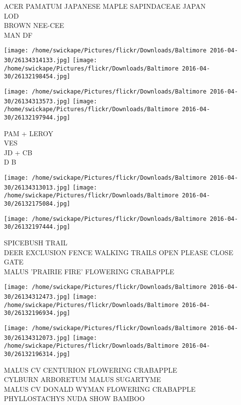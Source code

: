 \documentclass[10pt,letterpaper]{article}
\begin{document}
ACER PAMATUM JAPANESE MAPLE SAPINDACEAE JAPAN\\
LOD\\
BROWN NEE{-}CEE\\
MAN DF\\
\pagebreak

\texttt{[image: /home/swickape/Pictures/flickr/Downloads/Baltimore 2016-04-30/26134314133.jpg]}
\texttt{[image: /home/swickape/Pictures/flickr/Downloads/Baltimore 2016-04-30/26132198454.jpg]}

\texttt{[image: /home/swickape/Pictures/flickr/Downloads/Baltimore 2016-04-30/26134313573.jpg]}
\texttt{[image: /home/swickape/Pictures/flickr/Downloads/Baltimore 2016-04-30/26132197944.jpg]}

PAM + LEROY\\
VES\\
JD + CB\\
D B\\
\pagebreak

\texttt{[image: /home/swickape/Pictures/flickr/Downloads/Baltimore 2016-04-30/26134313013.jpg]}
\texttt{[image: /home/swickape/Pictures/flickr/Downloads/Baltimore 2016-04-30/26132175084.jpg]}

\vspace{0.25in}
\texttt{[image: /home/swickape/Pictures/flickr/Downloads/Baltimore 2016-04-30/26132197444.jpg]}

SPICEBUSH TRAIL\\
DEER EXCLUSION FENCE WALKING TRAILS OPEN PLEASE CLOSE GATE\\
MALUS 'PRAIRIE FIRE' FLOWERING CRABAPPLE\\
\pagebreak

\texttt{[image: /home/swickape/Pictures/flickr/Downloads/Baltimore 2016-04-30/26134312473.jpg]}
\texttt{[image: /home/swickape/Pictures/flickr/Downloads/Baltimore 2016-04-30/26132196934.jpg]}

\texttt{[image: /home/swickape/Pictures/flickr/Downloads/Baltimore 2016-04-30/26134312073.jpg]}
\texttt{[image: /home/swickape/Pictures/flickr/Downloads/Baltimore 2016-04-30/26132196314.jpg]}

MALUS CV CENTURION FLOWERING CRABAPPLE\\
CYLBURN ARBORETUM MALUS SUGARTYME\\
MALUS CV DONALD WYMAN FLOWERING CRABAPPLE\\
PHYLLOSTACHYS NUDA SHOW BAMBOO\\
\pagebreak
\end{document}
